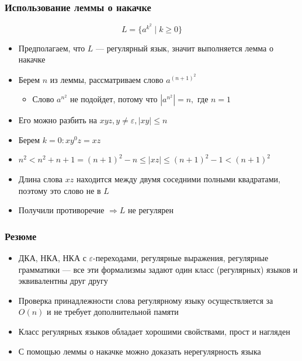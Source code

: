 \documentclass{beamer}
\begin{document}
\begin{frame}[fragile]
  \transwipe[direction=90]
  \frametitle{Использование леммы о накачке}
\[ L = \{ a^{k^2} \mid k \geq 0\} \]

  \begin{itemize}
    \item Предполагаем, что $L$ --- регулярный язык, значит выполняется лемма о накачке
    \item Берем $n$ из леммы, рассматриваем слово $a^{(n+1)^2}$
    \begin{itemize}
      \item Слово $a^{n^2}$ не подойдет, потому что $|a^{n^2}| = n, \text{ где } n = 1$
    \end{itemize}
    \item Его можно разбить на $xyz, y \neq \varepsilon, |xy| \leq n$
    \item Берем $k = 0: xy^0z = xz$
    \item $n^2 < n^2 + n + 1 = (n+1)^2 - n \leq |xz| \leq (n+1)^2 - 1 < (n+1)^2$
    \item Длина слова $xz$ находится между двумя соседними полными квадратами, поэтому это слово не в $L$
    \item Получили противоречие $\Rightarrow L$  не регулярен
  \end{itemize}

\end{frame}

\begin{frame}[fragile]
  \transwipe[direction=90]
  \frametitle{Резюме}
  \begin{itemize}
    \item ДКА, НКА, НКА с $\varepsilon$-переходами, регулярные выражения, регулярные грамматики --- все эти формализмы задают один класс (регулярных) языков и эквивалентны друг другу
    \item Проверка принадлежности слова регулярному языку осуществляется за $O(n)$ и не требует дополнительной памяти
    \item Класс регулярных языков обладает хорошими свойствами, прост и нагляден
    \item С помощью леммы о накачке можно доказать нерегулярность языка
  \end{itemize}

\end{frame}
\end{document}
